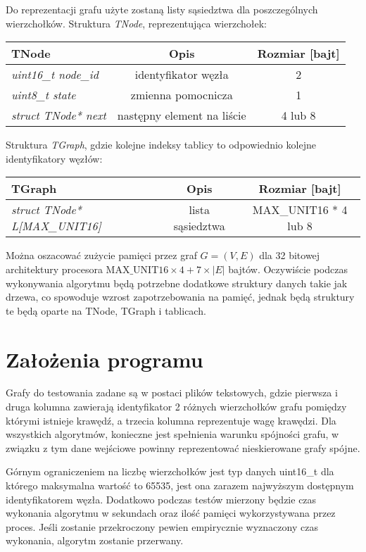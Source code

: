 \documentclass[a4paper, 10pt]{article}
\begin{document}
Do reprezentacji grafu użyte zostaną listy sąsiedztwa dla poszczególnych wierzchołków. Struktura
{\it TNode}, reprezentująca wierzchołek:

\begin{tabular}{|l|c|c|}
	\hline 
  {\bf TNode} & {\bf Opis} & {\bf Rozmiar [bajt]}\\
  \hline 
  \it{uint16\_t node\_id} & identyfikator węzła & 2 \\
  \hline
  \it{ uint8\_t state} & zmienna pomocnicza  &  1 \\
  \hline
  \it{ struct TNode* next} & następny element na liście & 4 lub 8 \\
  \hline 
\end{tabular} 

Struktura {\it TGraph}, gdzie kolejne indeksy tablicy to odpowiednio kolejne identyfikatory węzłów:

\begin{tabular}{|l|c|c|}
\hline {\bf TGraph} & {\bf Opis} & {\bf Rozmiar [bajt]}\\
  \hline 
   \it{struct TNode* L[MAX\_UNIT16]  } & lista sąsiedztwa & MAX\_UNIT16 * 4 lub 8 \\
  \hline
\end{tabular} 

Można oszacować zużycie pamięci przez graf $G=(V,E)$ dla 32 bitowej architektury procesora $\text{MAX\_UNIT16}\times4+7\times|E|$ bajtów.
Oczywiście podczas wykonywania algorytmu będą potrzebne dodatkowe struktury danych takie jak drzewa, co spowoduje wzrost zapotrzebowania na pamięć,
jednak będą struktury te będą oparte na TNode, TGraph i tablicach.



\section{Założenia programu}
Grafy do testowania zadane są w postaci plików tekstowych, gdzie pierwsza 
i druga kolumna zawierają identyfikator 2 różnych wierzchołków
grafu pomiędzy którymi istnieje krawędź, a trzecia kolumna reprezentuje
wagę krawędzi. Dla wszystkich algorytmów, konieczne jest spełnienia warunku spójności grafu, w związku z 
tym dane wejściowe powinny reprezentować nieskierowane grafy spójne. 


Górnym ograniczeniem na liczbę wierzchołków jest typ danych uint16\_t
dla którego maksymalna wartość to 65535, jest ona zarazem najwyższym dostępnym
identyfikatorem węzła. Dodatkowo podczas testów mierzony będzie czas wykonania algorytmu
w sekundach oraz ilość pamięci wykorzystywana przez proces. Jeśli zostanie przekroczony
pewien empirycznie wyznaczony czas wykonania, algorytm zostanie przerwany. 
\end{document}
